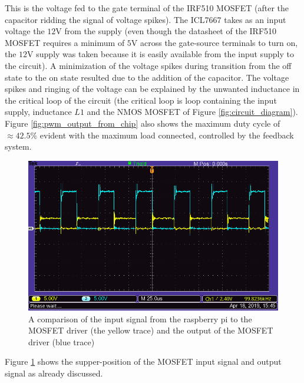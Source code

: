 \documentclass[a4paper, 12pt]{article}
\begin{document}
This is the voltage fed to the gate terminal of the IRF510 MOSFET (after the
capacitor ridding the signal of voltage spikes). The ICL7667 takes as an input
voltage the $12$V from the supply (even though the datasheet of the IRF510
MOSFET requires a minimum of $5$V across the gate-source terminals to turn on,
the $12$V supply was taken because it is easily available from the input supply
to the circuit). A minimization of the voltage spikes during transition from
the off state to the on state resulted due to the addition of the capacitor.
The voltage spikes and ringing of the voltage can be explained by the unwanted
inductance in the critical loop of the circuit (the critical loop is loop
containing the input supply, inductance $L1$ and the NMOS MOSFET of Figure
\ref{fig:circuit_diagram}). \\

Figure \ref{fig:pwm_output_from_chip} also shows the maximum duty cycle of $\approx 42.5\%$ evident with the maximum load connected, controlled by the feedback system.\\

\begin{figure}[H]
  \centering
  \includegraphics[width=\textwidth]{images/pwm_input_output_comparison.png}
  \caption{A comparison of the input signal from the raspberry pi to the MOSFET driver (the yellow trace) and the output of the MOSFET driver (blue trace)}
  \label{fig:pwm_input_output_comparison}
\end{figure}

Figure \ref{fig:pwm_input_output_comparison} shows the supper-position of the
MOSFET input signal and output signal as already discussed.\\
\end{document}
